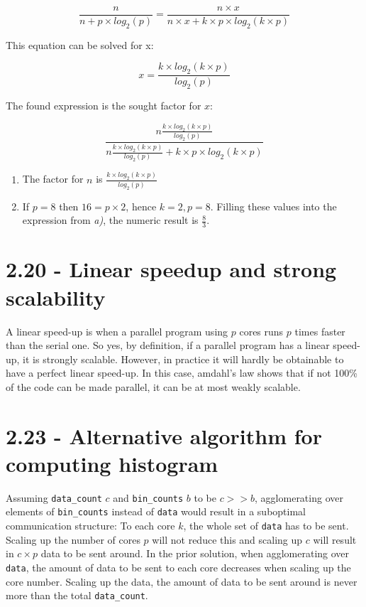 \documentclass[a4paper,11pt,twoside]{article}
\begin{document}
\begin{equation*}
\frac{n}{n + p \times log_{2}(p)} = \frac{n \times x}{n \times x + k \times p \times log_{2}(k \times p)}
\end{equation*}

This equation can be solved for x:

\begin{equation*}
x = \frac{k \times log_{2}(k \times p)}{log_{2}(p)}
\end{equation*}

The found expression is the sought factor for $x$:

\begin{equation*}
\frac{n\frac{k \times log_{2}(k\times p)}{log_{2}(p)}}{n \frac{k \times log_{2}(k \times p)}{log_{2}(p)} + k \times p \times log_{2}(k \times p)}
\end{equation*}


\begin{enumerate}[label={\alph*)}]
\item The factor for $n$ is $\frac{k \times log_{2}(k\times p)}{log_{2}(p)}$

\item If $p = 8$ then $16 = p \times 2$, hence $k = 2, p = 8$. Filling these values into the expression from \textit{a)}, the numeric result is $\frac{8}{3}$.
  
\end{enumerate}


\section{2.20 - Linear speedup and strong scalability}
A linear speed-up is when a parallel program using $p$ cores runs $p$ times faster than the serial one. So yes, by definition, if a parallel program has a linear speed-up, it is strongly scalable. However, in practice it will hardly be obtainable to have a perfect linear speed-up. In this case, amdahl's law shows that if not 100\% of the code can be made parallel, it can be at most weakly scalable.

\section{2.23 - Alternative algorithm for computing histogram}
Assuming \verb+data_count+ $c$ and \verb+bin_counts+ $b$ to be $c >> b$, agglomerating over elements of \verb+bin_counts+ instead of \verb+data+ would result in a suboptimal communication structure: To each core $k$, the whole set of \verb+data+ has to be sent. Scaling up the number of cores $p$ will not reduce this and scaling up $c$ will result in $c \times p$ data to be sent around. In the prior solution, when agglomerating over \verb+data+, the amount of data to be sent to each core decreases when scaling up the core number. Scaling up the data, the amount of data to be sent around is never more than the total \verb+data_count+.



\end{document}
